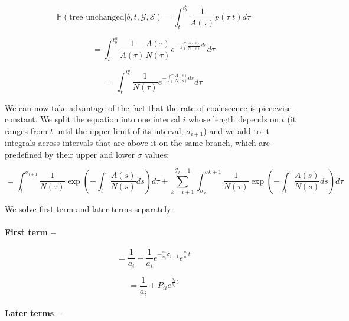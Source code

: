 \documentclass[11pt]{article}
\begin{document}
\begin{equation}
	\mathbb{P}(\textrm{tree unchanged} | b,t,\mathcal{G},\mathcal{S}) = \int_{t}^{t^u_b}\frac{1}{A(\tau)}p(\tau|t)d\tau
\end{equation}


\begin{equation}
	= \int_{t}^{t^u_b}\frac{1}{A(\tau)} \frac{A(\tau)}{N(\tau)}
	e^{-\int_t^\tau{}\frac{A(s)}{N(s)}ds} d\tau
\end{equation}


\begin{equation}
	= \int_{t}^{t^u_b}\frac{1}{N(\tau)}e^{-\int_t^\tau{}\frac{A(s)}{N(s)}ds} d\tau
\end{equation}



We can now take advantage of the fact that the rate of coalescence is piecewise-constant. We split the equation into one interval $i$ whose length depends on $t$ (it ranges from $t$ until the upper limit of its interval, $\sigma_{i+1}$) and we add to it integrals across intervals that are above it on the same branch, which are predefined by their upper and lower $\sigma$ values:

\begin{equation}
	= \int_{t}^{\sigma_{i+1}} \frac{1}{N(\tau)}\exp\left(-\int_{t}^{\tau}\frac{A(s)}{N(s)}ds\right)d\tau + \sum_{k=i+1}^{\mathcal{I}_b-1}\int_{\sigma_{k}}^{\sigma{k+1}}\frac{1}{N(\tau)}\exp\left(-\int_{t}^{\tau}\frac{A(s)}{N(s)}ds\right)d\tau
\end{equation}

We solve first term and later terms separately:

\paragraph{First term --}

\begin{equation}
	= \frac{1}{a_i} - \frac{1}{a_i}e^{-\frac{a_i}{n_i}\sigma_{i+1}}e^{\frac{a_i}{n_i}t}
\end{equation}

\begin{equation}
	= \frac{1}{a_i} +P_{ii}e^{\frac{a_i}{n_i}t}
\end{equation}

\paragraph{Later terms --}
\end{document}

